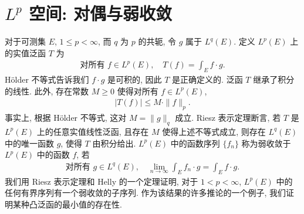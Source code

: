 \documentclass[../main.tex]{subfiles}
\begin{document}
\chapter{$L^{p}$ 空间: 对偶与弱收敛}\label{chapter:ch08-对偶与弱收敛}

对于可测集 $E$, $1\leqslant p<\infty$, 而 $q$ 为 $p$ 的共轭, 令 $g$ 属于 $L^{q}(E)$. 定义 $L^{p}(E)$ 上的实值泛函 $T$ 为
\begin{align*}
\text{对所有 }f\in L^{p}(E),\quad T(f)=\int_{E}f\cdot g.
\end{align*}
H\"older 不等式告诉我们 $f\cdot g$ 是可积的, 因此 $T$ 是正确定义的. 泛函 $T$ 继承了积分的线性. 此外, 存在常数 $M\geqslant 0$ 使得对所有 $f\in L^{p}(E)$,
\begin{align*}
|T(f)|\leqslant M\cdot\|f\|_{p}.
\end{align*}
事实上, 根据 H\"older 不等式, 这对 $M=\|g\|_{q}$ 成立. Riesz 表示定理断言, 若 $T$ 是 $L^{p}(E)$ 上的任意实值线性泛函, 且存在 $M$ 使得上述不等式成立, 则存在 $L^{q}(E)$ 中的唯一函数 $g$, 使得 $T$ 由积分给出. $L^{p}(E)$ 中的函数序列 $\{f_{n}\}$ 称为弱收敛于 $L^{p}(E)$ 中的函数 $f$, 若
\begin{align*}
\text{对所有 }g\in L^{q}(E),\quad\lim_{n\to\infty}\int_{E}f_{n}\cdot g=\int_{E}f\cdot g.
\end{align*}
我们用 Riesz 表示定理和 Helly 的一个定理证明, 对于 $1<p<\infty$, $L^{p}(E)$ 中的任何有界序列有一个弱收敛的子序列. 作为该结果的许多推论的一个例子, 我们证明某种凸泛函的最小值的存在性.








\end{document}
